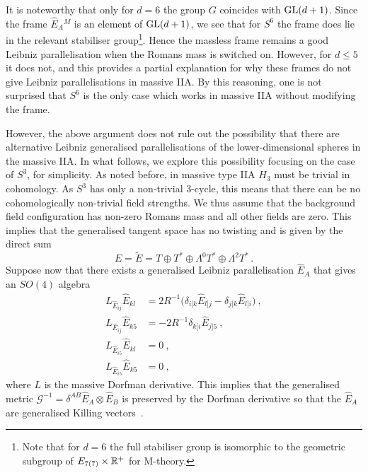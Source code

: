 \documentclass[debug]{phd}
\begin{document}
				It is noteworthy that only for $d=6$ the group $G$ coincides with $\mathrm{GL}(d+1)$. 
				Since the frame $\hat{E}_A{}^M$ is an element of $\mathrm{GL}(d+1)$, we see that for $S^6$ the frame does lie in the relevant stabiliser group\footnote{%
					Note that for $d=6$ the full stabiliser group is isomorphic to the geometric subgroup of $E_{7(7)}\times\mathbb{R}^+$ for M-theory.}.
				Hence the massless frame remains a good Leibniz parallelisation when the Romans mass is switched on. 
				However, for $d \leq 5$ it does not, and this provides a partial explanation for why these frames do not give Leibniz parallelisations in massive IIA. 
				By this reasoning, one is not surprised that $S^6$ is the only case which works in massive IIA without modifying the frame.

				However, the above argument does not rule out the possibility that there are alternative Leibniz generalised parallelisations of the lower-dimensional spheres in the massive IIA. 
				In what follows, we explore this possibility focusing on the case of $S^3$, for simplicity. 
				As noted before, in massive type IIA $H_3$ must be trivial in cohomology. 
				As $S^3$ has only a non-trivial 3-cycle, this means that there can be no cohomologically non-trivial field strengths. 
				We thus assume that the background field configuration has non-zero Romans mass and all other fields are zero. 
				This implies that the generalised tangent space has no twisting and is given by the direct sum 
							\begin{equation}
								E = \tilde{E} = T \oplus T^* \oplus \Lambda^0 T^* \oplus \Lambda^2 T^* \, .
							\end{equation}
				Suppose now that there exists a generalised Leibniz parallelisation $\hat{E}_A$ that gives an $SO(4)$ algebra
							\begin{equation}\label{massive_algebra_S3}
								\begin{split}
									L_{\hat{E}_{ij}}\hat{E}_{kl} &= 2R^{-1}\big(\delta_{i[k}\hat{E}_{l]j} - \delta_{j[k}\hat{E}_{l]i} \big)\ ,\\
									L_{\hat{E}_{ij}}\hat{E}_{k5} &= -2R^{-1}\delta_{k[i}\hat{E}_{j]5} \ , \\
									L_{\hat{E}_{i5}}\hat{E}_{kl} &=0\ , \\
									L_{\hat{E}_{i5}}\hat{E}_{k5} &= 0\ ,
								\end{split}
							\end{equation}
				where $L$ is the massive Dorfman derivative. 
				This implies that the generalised metric $\mathcal{G}^{-1} = \delta^{AB} \hat{E}_A \otimes \hat{E}_B$ is preserved by the Dorfman derivative so that the $\hat{E}_A$ are generalised Killing vectors~\cite{Grana:2008yw, Lee:2015xga}. 
\end{document}
